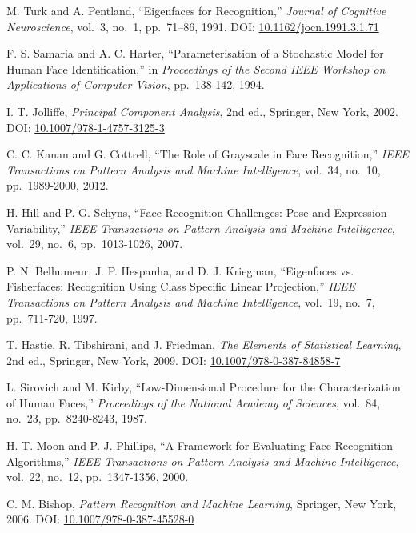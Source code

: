 \documentclass{article}
\begin{document}
\begin{thebibliography}{10}
	M. Turk and A. Pentland,
	``Eigenfaces for Recognition,''
	\textit{Journal of Cognitive Neuroscience},
	vol.\ 3, no.\ 1, pp.\ 71–86, 1991.
	DOI: \url{10.1162/jocn.1991.3.1.71}
	
	F. S. Samaria and A. C. Harter,
	``Parameterisation of a Stochastic Model for Human Face Identification,''
	in \textit{Proceedings of the Second IEEE Workshop on Applications of Computer Vision},
	pp.\ 138-142, 1994.

	I. T. Jolliffe,
	\textit{Principal Component Analysis},
	2nd ed.,
	Springer, New York, 2002.
	DOI: \url{10.1007/978-1-4757-3125-3}
	
	C. C. Kanan and G. Cottrell,
	``The Role of Grayscale in Face Recognition,''
	\textit{IEEE Transactions on Pattern Analysis and Machine Intelligence},
	vol.\ 34, no.\ 10, pp.\ 1989-2000, 2012.
	
	H. Hill and P. G. Schyns,
	``Face Recognition Challenges: Pose and Expression Variability,''
	\textit{IEEE Transactions on Pattern Analysis and Machine Intelligence},
	vol.\ 29, no.\ 6, pp.\ 1013-1026, 2007.
	
	P. N. Belhumeur, J. P. Hespanha, and D. J. Kriegman,
	``Eigenfaces vs. Fisherfaces: Recognition Using Class Specific Linear Projection,''
	\textit{IEEE Transactions on Pattern Analysis and Machine Intelligence},
	vol.\ 19, no.\ 7, pp.\ 711-720, 1997.
	
	T. Hastie, R. Tibshirani, and J. Friedman,
	\textit{The Elements of Statistical Learning},
	2nd ed.,
	Springer, New York, 2009.
	DOI: \url{10.1007/978-0-387-84858-7}
	
	L. Sirovich and M. Kirby,
	``Low-Dimensional Procedure for the Characterization of Human Faces,''
	\textit{Proceedings of the National Academy of Sciences},
	vol.\ 84, no.\ 23, pp.\ 8240-8243, 1987.
	
	H. T. Moon and P. J. Phillips,
	``A Framework for Evaluating Face Recognition Algorithms,''
	\textit{IEEE Transactions on Pattern Analysis and Machine Intelligence},
	vol.\ 22, no.\ 12, pp.\ 1347-1356, 2000.
	
	C. M. Bishop,
	\textit{Pattern Recognition and Machine Learning},
	Springer, New York, 2006.
	DOI: \url{10.1007/978-0-387-45528-0}
	
\end{thebibliography}
\end{document}
